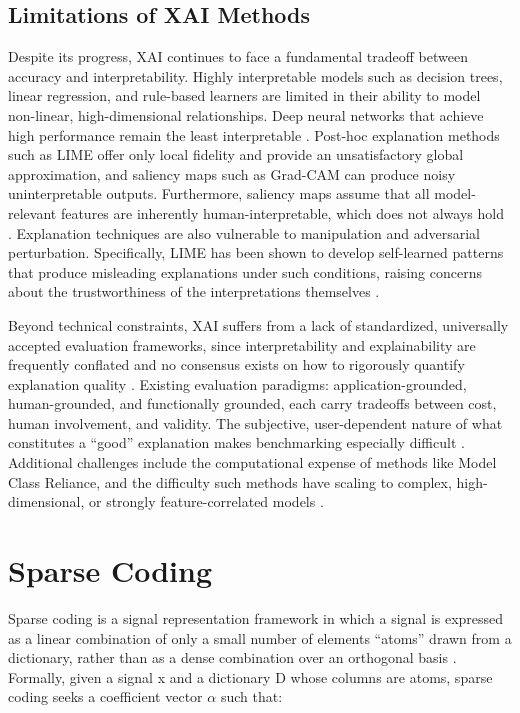 \subsection{Limitations of XAI Methods}

Despite its progress, XAI continues to face a fundamental tradeoff between accuracy and interpretability.
Highly interpretable models
such as decision trees, linear regression, and rule-based learners are limited in their ability to model non-linear,
high-dimensional relationships. Deep neural networks that achieve high performance remain the least interpretable
\cite{hassija2024interpreting}. Post-hoc explanation methods such as LIME offer only local fidelity and provide an
unsatisfactory global approximation, and saliency maps such as Grad-CAM can produce noisy uninterpretable outputs.
Furthermore, saliency maps assume that all model-relevant features are inherently human-interpretable, which does
not always hold \cite{ribeiro2024explainable}. Explanation techniques are also vulnerable to manipulation and
adversarial perturbation. Specifically, LIME has been shown to develop self-learned patterns that produce misleading
explanations under such conditions, raising concerns about the trustworthiness of the interpretations themselves \cite{ribeiro2024explainable}.

Beyond technical constraints, XAI suffers from a lack of standardized, universally accepted evaluation frameworks, since
interpretability and explainability are frequently conflated and no consensus exists on how to rigorously quantify explanation
quality \cite{doshi2017towards, guidotti2024counterfactual}. Existing evaluation paradigms: application-grounded, human-grounded,
and functionally grounded, each carry tradeoffs between cost, human involvement, and validity. The subjective,
user-dependent nature of what constitutes a ``good'' explanation makes benchmarking especially difficult \cite{hassija2024interpreting}.
Additional challenges include the computational expense of methods like Model Class Reliance, and the difficulty such methods have
scaling to complex, high-dimensional, or strongly feature-correlated models \cite{van2004explainable}.

\section{Sparse Coding}

Sparse coding is a signal representation framework in which a signal is expressed as a linear combination of only a small number
of elements ``atoms'' drawn from a dictionary, rather than as a dense combination over an orthogonal basis \citep{elad2010sparse}. Formally, given a
signal x and a dictionary D whose columns are atoms, sparse coding seeks a coefficient vector $\alpha$ such that:

